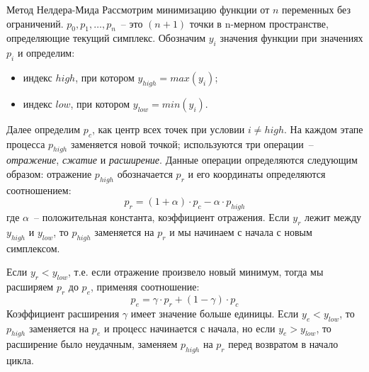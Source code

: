 \documentclass[aspectratio=169, mathserif]{beamer}	%
\begin{document}
\begin{frame}[fragile]{Метод Нелдера-Мида}
\scriptsize
Рассмотрим минимизацию функции от $n$ переменных без ограничений. $p_0, p_1, \ldots, p_n$~-- это $(n+1)$ точки в n-мерном пространстве, определяющие текущий симплекс. Обозначим $y_i$ значения функции при значениях $p_i$ и определим:
\begin{itemize}
	\item индекс $high$, при котором $y_{high}=max\left(y_i\right)$;
	\item индекс $low$, при котором $y_{low}=min\left(y_i\right)$.
\end{itemize}
Далее определим $p_c$, как центр всех точек при условии $i \ne high$. На каждом этапе процесса $p_{high}$ заменяется новой точкой; используются три операции~-- \textit{отражение}, \textit{сжатие} и \textit{расширение}. Данные операции определяются следующим образом: отражение $p_{high}$ обозначается $p_r$ и его координаты определяются соотношением:
\begin{equation}\label{eq:reflection}
	p_r = \left(1 + \alpha\right)\cdot p_c - \alpha \cdot p_{high}
\end{equation}
\noindent где $\alpha$~-- положительная константа, коэффициент отражения.
Если $y_r$ лежит между $y_{high}$ и $y_{low}$, то $p_{high}$ заменяется на $p_r$ и мы начинаем с начала с новым симплексом.

Если $y_r < y_{low}$, т.е. если отражение произвело новый минимум, тогда мы расширяем $p_r$ до $p_e$, применяя соотношение:
\begin{equation}\label{eq:expantion}
	p_e = \gamma \cdot p_r + \left(1 - \gamma\right)\cdot p_c
\end{equation}
Коэффициент расширения $\gamma$ имеет значение больше единицы. Если $y_e < y_{low}$, то $p_{high}$ заменяется на $p_e$ и процесс начинается с начала, но если $y_e > y_{low}$, то расширение было неудачным, заменяем $p_{high}$ на $p_r$ перед возвратом в начало цикла.
\vfill
\end{frame}
\end{document}
